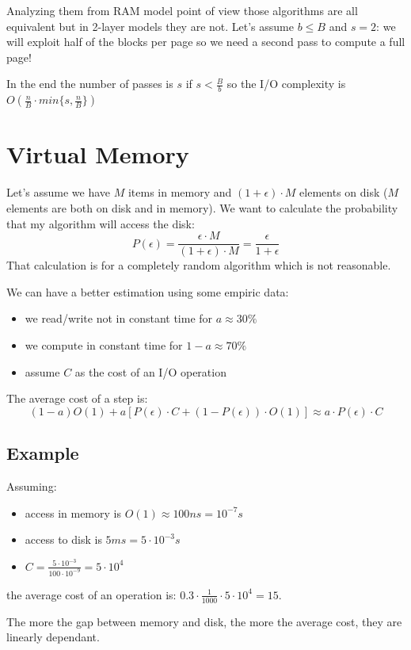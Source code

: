 Analyzing them from RAM model point of view those algorithms are all equivalent but in 2-layer models they are not.
Let's assume $b \leq B$ and $s=2$: we will exploit half of the blocks per page so we need a second pass to compute a full page!

In the end the number of passes is $s$ if $s < \frac{B}{b}$ so the I/O complexity is $O(\frac{n}{B} \cdot min\{s, \frac{n}{B}\})$

\section{Virtual Memory}
Let's assume we have $M$ items in memory and $(1+\epsilon)\cdot M$ elements on disk ($M$ elements are both on disk and in memory).
We want to calculate the probability that my algorithm will access the disk:
$$
    P(\epsilon) = \frac{\epsilon \cdot M}{(1+\epsilon)\cdot M} = \frac{\epsilon}{1+\epsilon}
$$
That calculation is for a completely random algorithm which is not reasonable.

We can have a better estimation using some empiric data:
\begin{itemize}
    \item we read/write not in constant time for $a \approx 30\%$
    \item we compute in constant time for $1-a \approx 70\%$
    \item assume $C$ as the cost of an I/O operation
\end{itemize}
The average cost of a step is:
$$
    (1-a)O(1) + a[P(\epsilon) \cdot C + (1-P(\epsilon))\cdot O(1)] \approx a \cdot P(\epsilon) \cdot C
$$

\subsection{Example}
Assuming:
\begin{itemize}
    \item access in memory is $O(1) \approx 100ns = 10^{-7}s$
    \item access to disk is $5ms = 5 \cdot 10^{-3}s$
    \item $C = \frac{5 \cdot 10^{-3}}{100 \cdot 10^{-9}} = 5 \cdot 10^4$
\end{itemize}
the average cost of an operation is: $0.3 \cdot \frac{1}{1000} \cdot 5 \cdot 10^4 = 15$.

The more the gap between memory and disk, the more the average cost, they are linearly dependant.



